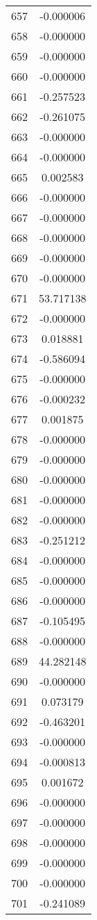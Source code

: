 \documentclass[12pt]{article}
\begin{document}
\begin{longtable}{@{}cc@{}}
657 & -0.000006 \\
658 & -0.000000 \\
659 & -0.000000 \\
660 & -0.000000 \\
661 & -0.257523 \\
662 & -0.261075 \\
663 & -0.000000 \\
664 & -0.000000 \\
665 & 0.002583 \\
666 & -0.000000 \\
667 & -0.000000 \\
668 & -0.000000 \\
669 & -0.000000 \\
670 & -0.000000 \\
671 & 53.717138 \\
672 & -0.000000 \\
673 & 0.018881 \\
674 & -0.586094 \\
675 & -0.000000 \\
676 & -0.000232 \\
677 & 0.001875 \\
678 & -0.000000 \\
679 & -0.000000 \\
680 & -0.000000 \\
681 & -0.000000 \\
682 & -0.000000 \\
683 & -0.251212 \\
684 & -0.000000 \\
685 & -0.000000 \\
686 & -0.000000 \\
687 & -0.105495 \\
688 & -0.000000 \\
689 & 44.282148 \\
690 & -0.000000 \\
691 & 0.073179 \\
692 & -0.463201 \\
693 & -0.000000 \\
694 & -0.000813 \\
695 & 0.001672 \\
696 & -0.000000 \\
697 & -0.000000 \\
698 & -0.000000 \\
699 & -0.000000 \\
700 & -0.000000 \\
701 & -0.241089 \\

\end{longtable}
\end{document}
